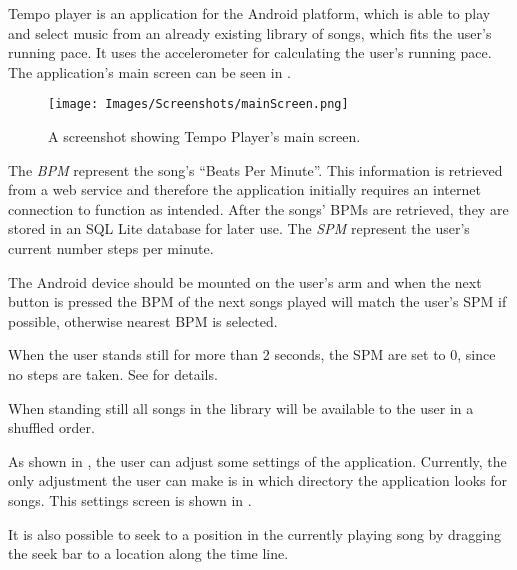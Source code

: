 Tempo player is an application for the Android platform, which is able to play and select music from an already existing library of songs, which fits the user's running pace. It uses the accelerometer for calculating the user's running pace. The application's main screen can be seen in . 

\begin{figure}[h!]
  \centering
    \texttt{[image: Images/Screenshots/mainScreen.png]}
  \caption{A screenshot showing Tempo Player's main screen.}
  \label{fig:mainScreen}
\end{figure}

The \textit{BPM} represent the song's ``Beats Per Minute''. This information is retrieved from a web service and therefore the application initially requires an internet connection to function as intended. After the songs' BPMs are retrieved, they are stored in an SQL Lite database for later use. The \textit{SPM} represent the user's current number steps per minute.

The Android device should be mounted on the user's arm and when the next button is pressed the BPM of the next songs played will match the user's SPM if possible, otherwise nearest BPM is selected.

When the user stands still for more than 2 seconds, the SPM are set to 0, since no steps are taken. See  for details. 

When standing still all songs in the library will be available to the user in a shuffled order.

As shown in , the user can adjust some settings of the application. Currently, the only adjustment the user can make is in which directory the application looks for songs. This settings screen is shown in . 

It is also possible to seek to a position in the currently playing song by dragging the seek bar to a location along the time line. 


